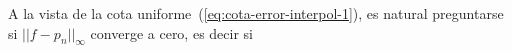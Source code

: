 \begin{remark}
  A la vista de la cota uniforme~(\ref{eq:cota-error-interpol-1}), es
  natural preguntarse si $||f-p_n||_{\infty}$ converge a cero, es
  decir si
\end{remark}
